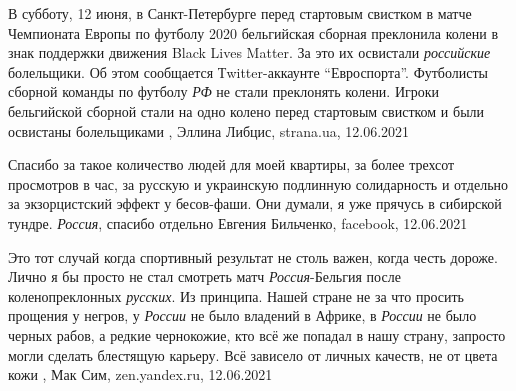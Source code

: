 В субботу, 12 июня, в Санкт-Петербурге перед стартовым свистком в матче
Чемпионата Европы по футболу 2020 бельгийская сборная преклонила колени в знак
поддержки движения Black Lives Matter. За это их освистали \emph{российские}
болельщики. Об этом сообщается Тwitter-аккаунте \enquote{Евроспорта}.
Футболисты сборной команды по футболу \emph{РФ} не стали преклонять колени.
Игроки бельгийской сборной стали на одно колено перед стартовым свистком и были
освистаны болельщиками
, 
Эллина Либцис, strana.ua, 12.06.2021

Спасибо за такое количество людей для моей квартиры, за более трехсот
просмотров в час, за русскую и украинскую подлинную солидарность и отдельно за
экзорцистский эффект у бесов-фаши. Они думали, я уже прячусь в сибирской
тундре. \emph{Россия}, спасибо отдельно
Евгения Бильченко, facebook, 12.06.2021

Это тот случай когда спортивный результат не столь важен, когда честь дороже.
Лично я бы просто не стал смотреть матч \emph{Россия}-Бельгия после коленопреклонных
\emph{русских}. Из принципа. Нашей стране не за что просить прощения у негров, у
\emph{России} не было владений в Африке, в \emph{России} не было черных рабов, а редкие
чернокожие, кто всё же попадал в нашу страну, запросто могли сделать блестящую
карьеру. Всё зависело от личных качеств, не от цвета кожи
, 
Мак Сим, zen.yandex.ru, 12.06.2021

